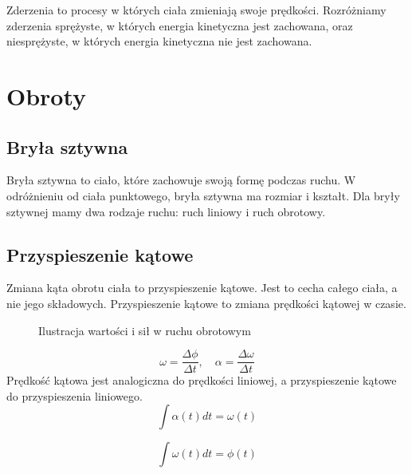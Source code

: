 \documentclass{../notatki}
\begin{document}
Zderzenia to procesy w których ciała zmieniają swoje prędkości. Rozróżniamy
zderzenia sprężyste, w których energia kinetyczna jest zachowana, oraz
niesprężyste, w których energia kinetyczna nie jest zachowana.

\section{Obroty}

\subsection{Bryła sztywna}

Bryła sztywna to ciało, które zachowuje swoją formę podczas ruchu. W odróżnieniu
od ciała punktowego, bryła sztywna ma rozmiar i kształt. Dla bryły sztywnej
mamy dwa rodzaje ruchu: ruch liniowy i ruch obrotowy.

\subsection{Przyspieszenie kątowe}

Zmiana kąta obrotu ciała to przyspieszenie kątowe. Jest to cecha całego ciała,
a nie jego składowych. Przyspieszenie kątowe to zmiana prędkości kątowej
w czasie.
\begin{figure*}[ht]
  \centering
  \caption{Ilustracja wartości i sił w ruchu obrotowym}
\end{figure*}

$$
\omega = \frac{\Delta \phi}{\Delta t}, \quad \alpha = \frac{\Delta
\omega}{\Delta t}
$$
Prędkość kątowa jest analogiczna do prędkości liniowej, a przyspieszenie
kątowe do przyspieszenia liniowego.
$$
\int \alpha(t) dt = \omega(t)
$$

$$
\int \omega(t) dt = \phi(t)
$$
\end{document}
